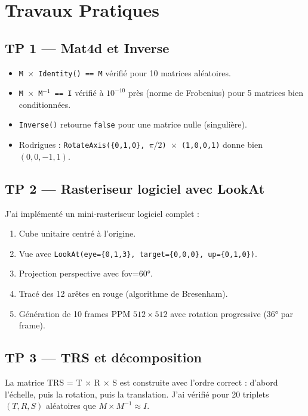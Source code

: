 \documentclass[12pt,a4paper]{report}
\newcommand{\code}[1]{\texttt{\textcolor{myblue}{#1}}}
\begin{document}
\section{Travaux Pratiques}

\subsection{TP 1 — Mat4d et Inverse}

\begin{itemize}
    \item \code{M $\times$ Identity() == M} vérifié pour 10 matrices aléatoires.
    \item \code{M $\times$ M$^{-1}$ == I} vérifié à $10^{-10}$ près (norme de Frobenius) pour 5 matrices bien conditionnées.
    \item \code{Inverse()} retourne \code{false} pour une matrice nulle (singulière).
    \item Rodrigues : \code{RotateAxis(\{0,1,0\}, $\pi/2$) $\times$ (1,0,0,1)} donne bien $(0, 0, -1, 1)$.
\end{itemize}

\subsection{TP 2 — Rasteriseur logiciel avec LookAt}

J'ai implémenté un mini-rasteriseur logiciel complet :
\begin{enumerate}
    \item Cube unitaire centré à l'origine.
    \item Vue avec \code{LookAt(eye=\{0,1,3\}, target=\{0,0,0\}, up=\{0,1,0\})}.
    \item Projection perspective avec fov=60°.
    \item Tracé des 12 arêtes en rouge (algorithme de Bresenham).
    \item Génération de 10 frames PPM $512\times512$ avec rotation progressive (36° par frame).
\end{enumerate}

\subsection{TP 3 — TRS et décomposition}

La matrice TRS = T $\times$ R $\times$ S est construite avec l'ordre correct : d'abord l'échelle, puis la rotation, puis la translation. J'ai vérifié pour 20 triplets $(T, R, S)$ aléatoires que $M \times M^{-1} \approx I$.
\end{document}

